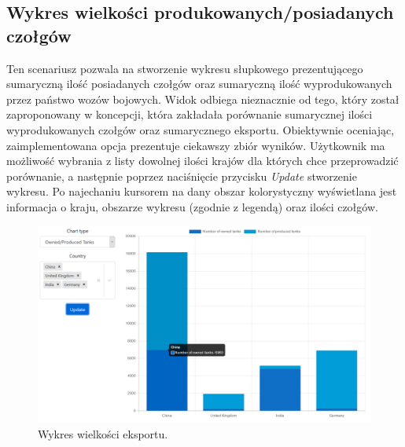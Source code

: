 \subsection{Wykres wielkości produkowanych/posiadanych czołgów}
Ten scenariusz pozwala na stworzenie wykresu słupkowego prezentującego sumaryczną ilość posiadanych czołgów oraz sumaryczną ilość wyprodukowanych przez państwo wozów bojowych. Widok odbiega nieznacznie od tego, który został zaproponowany w koncepcji, która zakładała porównanie sumarycznej ilości wyprodukowanych czołgów oraz sumarycznego eksportu. Obiektywnie oceniając, zaimplementowana opcja prezentuje ciekawszy zbiór wyników. Użytkownik ma możliwość wybrania z listy dowolnej ilości krajów dla których chce przeprowadzić porównanie, a następnie poprzez naciśnięcie przycisku \textit{Update} stworzenie wykresu. Po najechaniu kursorem na dany obszar kolorystyczny wyświetlana jest informacja o kraju, obszarze wykresu (zgodnie z legendą) oraz ilości czołgów. 
\begin{figure}[H]
    \centering \includegraphics[width=0.9\linewidth]{tex/owned_produced.PNG}
    \caption{Wykres wielkości eksportu.}
    \label{fig:owned_exported}
\end{figure}
